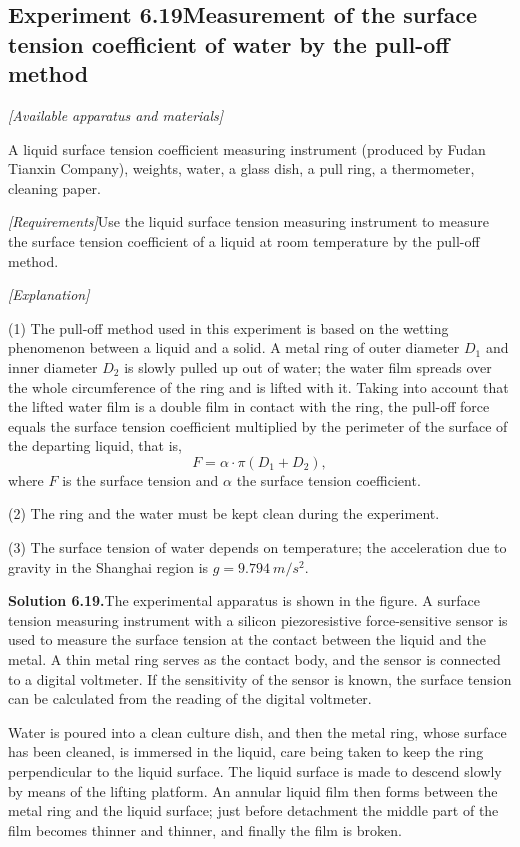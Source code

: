 \subsection*{Experiment 6.19\quad Measurement of the surface tension coefficient of water by the pull-off method}

\noindent\textit{[Available apparatus and materials]}

A liquid surface tension coefficient measuring instrument (produced by Fudan Tianxin Company), weights, water, a glass dish, a pull ring, a thermometer, cleaning paper.

\noindent\textit{[Requirements]}\quad Use the liquid surface tension measuring instrument to measure the surface tension coefficient of a liquid at room temperature by the pull-off method.

\noindent\textit{[Explanation]}

(1) The pull-off method used in this experiment is based on the wetting phenomenon between a liquid and a solid. A metal ring of outer diameter $D_1$ and inner diameter $D_2$ is slowly pulled up out of water; the water film spreads over the whole circumference of the ring and is lifted with it. Taking into account that the lifted water film is a double film in contact with the ring, the pull-off force equals the surface tension coefficient multiplied by the perimeter of the surface of the departing liquid, that is,
\begin{equation*}
F=\alpha\cdot\pi(D_1+D_2),
\end{equation*}
where $F$ is the surface tension and $\alpha$ the surface tension coefficient.

(2) The ring and the water must be kept clean during the experiment.

(3) The surface tension of water depends on temperature; the acceleration due to gravity in the Shanghai region is $g=\SI{9.794}{m/s^2}$.

\medskip
\noindent\textbf{Solution 6.19.}\quad The experimental apparatus is shown in the figure. A surface tension measuring instrument with a silicon piezoresistive force-sensitive sensor is used to measure the surface tension at the contact between the liquid and the metal. A thin metal ring serves as the contact body, and the sensor is connected to a digital voltmeter. If the sensitivity of the sensor is known, the surface tension can be calculated from the reading of the digital voltmeter.

Water is poured into a clean culture dish, and then the metal ring, whose surface has been cleaned, is immersed in the liquid, care being taken to keep the ring perpendicular to the liquid surface. The liquid surface is made to descend slowly by means of the lifting platform. An annular liquid film then forms between the metal ring and the liquid surface; just before detachment the middle part of the film becomes thinner and thinner, and finally the film is broken.

